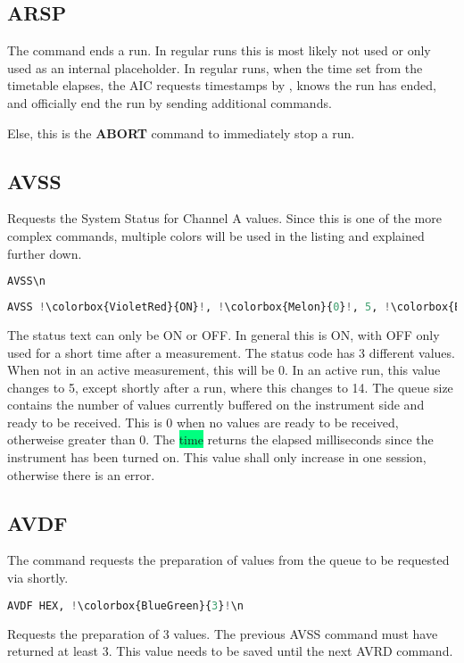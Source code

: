 \documentclass[]{scrartcl}
\begin{document}
	\subsection{ARSP}
	The  command ends a run. In regular runs this is most likely not used or only used as an internal placeholder.
	In regular runs, when the time set from the timetable elapses, the AIC requests timestamps by , knows the run has ended, and officially end the run by sending additional  commands.

	Else, this is the \textbf{ABORT} command to immediately stop a run.
	\subsection{AVSS}
	Requests the System Status for Channel A values.
	Since this is one of the more complex commands, multiple colors will be used in the listing and explained further down.
\begin{lstlisting}[language=Python,escapechar=!,caption=Request (AIC$\rightarrow{}$Instrument) System State Channel A,breaklines=true,showspaces=true]
AVSS\n
\end{lstlisting}
\begin{lstlisting}[language=Python,escapechar=!,caption=Response 1 (Instrument$\rightarrow{}$AIC) System State Channel A,breaklines=true,showspaces=true]
AVSS !\colorbox{VioletRed}{ON}!, !\colorbox{Melon}{0}!, 5, !\colorbox{BlueGreen}{1}!, !\colorbox{SpringGreen}{123456789}!\n
\end{lstlisting}
The \colorbox{VioletRed}{status text} can only be ON or OFF. In general this is ON, with OFF only used for a short time after a measurement.
The \colorbox{Melon}{status code} has 3 different values. When not in an active measurement, this will be \colorbox{Melon}{0}. In an active run, this value changes to \colorbox{Melon}{5}, except shortly after a run, where this changes to \colorbox{Melon}{14}.
The \colorbox{BlueGreen}{queue size} contains the number of values currently buffered on the instrument side and ready to be received. This is 0 when no values are ready to be received, otherweise greater than 0.
The \colorbox{SpringGreen}{time} returns the elapsed milliseconds since the instrument has been turned on. This value shall only increase in one session, otherwise there is an error.
	\subsection{AVDF}
The  command requests the preparation of values from the queue to be requested via  shortly.
\begin{lstlisting}[language=Python,escapechar=!,caption=Request (AIC$\rightarrow{}$Instrument) System State Channel A,breaklines=true,showspaces=true]
AVDF HEX, !\colorbox{BlueGreen}{3}!\n
\end{lstlisting}
Requests the preparation of 3 values. The previous AVSS command must have returned at least \colorbox{BlueGreen}{3}.
This value needs to be saved until the next AVRD command.
\end{document}
